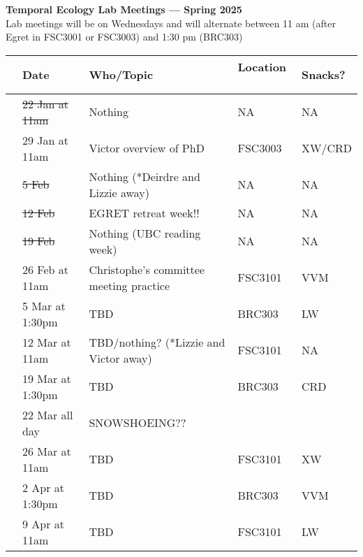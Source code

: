 \documentclass[11pt]{article}
\begin{document}
 
\raggedright
{}

\begin{center} 
{\large \textbf{Temporal Ecology Lab Meetings --- Spring 2025}} \\ [2pt]
Lab meetings will be on Wednesdays and will alternate between 11 am (after Egret in FSC3001 or FSC3003) and 1:30 pm (BRC303)\\ %
\end{center} 

\begin{center}
\begin{tabular}{ p{0.2 cm}  p{3 cm}  p{6 cm}  p{4 cm} p{1.5 cm} }  \hline \hline
 & \textbf{Date}
   & \textbf{Who/Topic}
      & \textbf{Location}  \
            & \textbf{Snacks?}  \\ 
\hline \hline
&\sout{22 Jan at 11am}& Nothing  & NA & NA \\\hline
&29 Jan at 11am & Victor overview of PhD & FSC3003 & XW/CRD \\\hline
&\sout{5 Feb} & Nothing (*Deirdre and Lizzie away) &NA&NA\\\hline
&\sout{12 Feb} & EGRET retreat week!! & NA &NA \\\hline
&\sout{19 Feb} & Nothing (UBC reading week) &NA& NA \\\hline
&26 Feb at 11am & Christophe's committee meeting practice & FSC3101& VVM \\\hline
&5 Mar at 1:30pm & TBD  & BRC303 & LW \\\hline
&12 Mar at 11am & TBD/nothing? (*Lizzie and Victor away) & FSC3101 &NA \\\hline
&19 Mar at 1:30pm & TBD & BRC303 &  CRD \\\hline
&22 Mar all day & SNOWSHOEING?? & &   \\\hline
&26 Mar at 11am & TBD & FSC3101 &XW \\\hline
&2 Apr at 1:30pm & TBD & BRC303& VVM \\\hline
&9 Apr at 11am & TBD &FSC3101& LW \\\hline
\end{tabular}
\end{center}

\vspace{6pt}

\vspace{6pt}
\end{document}
